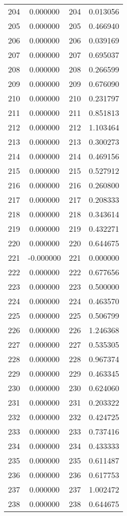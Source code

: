 \documentclass[12pt]{article}
\begin{document}
\begin{longtable}{@{}cccc@{}}
204 & 0.000000 & 204 & 0.013056 \\
205 & 0.000000 & 205 & 0.466940 \\
206 & 0.000000 & 206 & 0.039169 \\
207 & 0.000000 & 207 & 0.695037 \\
208 & 0.000000 & 208 & 0.266599 \\
209 & 0.000000 & 209 & 0.676090 \\
210 & 0.000000 & 210 & 0.231797 \\
211 & 0.000000 & 211 & 0.851813 \\
212 & 0.000000 & 212 & 1.103464 \\
213 & 0.000000 & 213 & 0.300273 \\
214 & 0.000000 & 214 & 0.469156 \\
215 & 0.000000 & 215 & 0.527912 \\
216 & 0.000000 & 216 & 0.260800 \\
217 & 0.000000 & 217 & 0.208333 \\
218 & 0.000000 & 218 & 0.343614 \\
219 & 0.000000 & 219 & 0.432271 \\
220 & 0.000000 & 220 & 0.644675 \\
221 & -0.000000 & 221 & 0.000000 \\
222 & 0.000000 & 222 & 0.677656 \\
223 & 0.000000 & 223 & 0.500000 \\
224 & 0.000000 & 224 & 0.463570 \\
225 & 0.000000 & 225 & 0.506799 \\
226 & 0.000000 & 226 & 1.246368 \\
227 & 0.000000 & 227 & 0.535305 \\
228 & 0.000000 & 228 & 0.967374 \\
229 & 0.000000 & 229 & 0.463345 \\
230 & 0.000000 & 230 & 0.624060 \\
231 & 0.000000 & 231 & 0.203322 \\
232 & 0.000000 & 232 & 0.424725 \\
233 & 0.000000 & 233 & 0.737416 \\
234 & 0.000000 & 234 & 0.433333 \\
235 & 0.000000 & 235 & 0.611487 \\
236 & 0.000000 & 236 & 0.617753 \\
237 & 0.000000 & 237 & 1.002472 \\
238 & 0.000000 & 238 & 0.644675 \\

\end{longtable}
\end{document}
